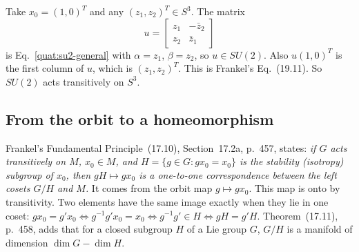 Take $x_0=(1,0)^T$ and any $(z_1,z_2)^T\in S^3$. The matrix
\begin{equation}\label{quat:frankel-19-11}
 u=\begin{bmatrix}z_1&-\bar z_2\\z_2&\bar z_1\end{bmatrix}
\end{equation}
is Eq.~\eqref{quat:su2-general} with $\alpha=z_1$, $\beta=z_2$, so
$u\in SU(2)$. Also $u(1,0)^T$ is the first column of $u$, which is
$(z_1,z_2)^T$. This is Frankel's Eq.~(19.11). So $SU(2)$ acts transitively
on $S^3$.

\subsection{From the orbit to a homeomorphism}
Frankel's Fundamental Principle~(17.10), Section~17.2a, p.~457, states:
\emph{if $G$ acts transitively on $M$, $x_0\in M$, and
$H=\{g\in G:gx_0=x_0\}$ is the stability (isotropy) subgroup of $x_0$, then
$gH\mapsto gx_0$ is a one-to-one correspondence between the left cosets
$G/H$ and $M$.} It comes from the orbit map $g\mapsto gx_0$. This map is
onto by transitivity. Two elements have the same image exactly when they lie
in one coset: $gx_0=g'x_0\iff g^{-1}g'x_0=x_0\iff g^{-1}g'\in H\iff
gH=g'H$. Theorem~(17.11), p.~458, adds that for a closed subgroup $H$ of a
Lie group $G$, $G/H$ is a manifold of dimension $\dim G-\dim H$.

